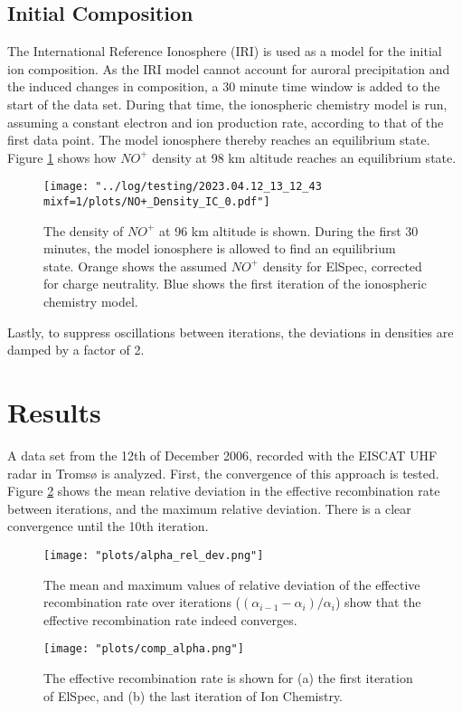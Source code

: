 \documentclass[10pt, a4paper]{article}
\numberwithin{equation}{section}										%
\begin{document}
\subsection{Initial Composition}
The International Reference Ionosphere (IRI) \cite{bilitza_international_2014} is used as a model for the initial ion composition. As the IRI model cannot account for auroral precipitation and the induced changes in composition, a 30 minute time window is added to the start of the data set. During that time, the ionospheric chemistry model is run, assuming a constant electron and ion production rate, according to that of the first data point. The model ionosphere thereby reaches an equilibrium state. Figure \ref{fig:dialin} shows how $NO^+$ density at 98 km altitude reaches an equilibrium state.


\begin{figure}
	\centering
	\texttt{[image: "../log/testing/2023.04.12\_13\_12\_43 mixf=1/plots/NO+\_Density\_IC\_0.pdf"]}
	\caption{The density of $NO^+$ at 96 km altitude is shown. During the first 30 minutes, the model ionosphere is allowed to find an equilibrium state. Orange shows the assumed $NO^+$ density for ElSpec, corrected for charge neutrality. Blue shows the first iteration of the ionospheric chemistry model.}
	\label{fig:dialin}
\end{figure}
%

Lastly, to suppress oscillations between iterations, the deviations in densities are damped by a factor of 2.


\section{Results}
A data set from the 12th of December 2006, recorded with the EISCAT UHF radar in Tromsø is analyzed. First, the convergence of this approach is tested. Figure \ref{fig:convergence} shows the mean relative deviation in the effective recombination rate between iterations, and the maximum relative deviation. There is a clear convergence until the 10th iteration. 

\begin{figure}
	\centering
	\texttt{[image: "plots/alpha\_rel\_dev.png"]}
	\caption{The mean and maximum values of relative deviation of the effective recombination rate over iterations ($(\alpha_{i-1} - \alpha_{i})/\alpha_{i} $) show that the effective recombination rate indeed converges.}
	\label{fig:convergence}
\end{figure}
%
\par\medskip
%
\begin{figure}
	\centering
	\texttt{[image: "plots/comp\_alpha.png"]}
	\caption{The effective recombination rate is shown for (a) the first iteration of ElSpec, and (b) the last iteration of Ion Chemistry.}
	\label{fig:alpha}
\end{figure}
\end{document}

